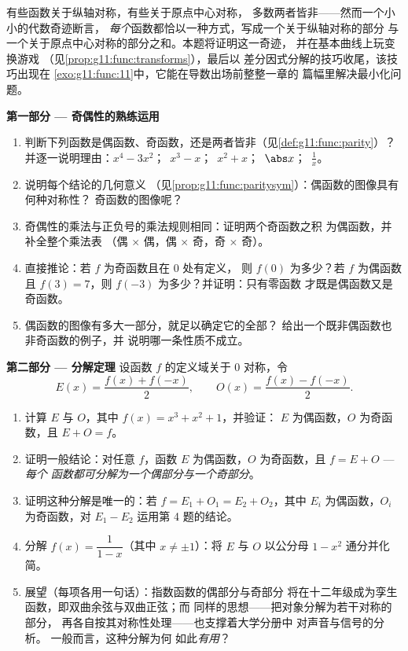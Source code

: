 \begin{problem}
\label{pb:g11:func:1}
有些函数关于纵轴对称，有些关于原点中心对称，
多数两者皆非——然而一个小小的代数奇迹断言，
\emph{每个}函数都恰以一种方式，写成一个关于纵轴对称的部分
与一个关于原点中心对称的部分之和。本题将证明这一奇迹，
并在基本曲线上玩变换游戏
（见\cref{prop:g11:func:transforms}），最后以
差分因式分解的技巧收尾，该技巧出现在
\cref{exo:g11:func:11}中，它能在导数出场前整整一章的
篇幅里解决最小化问题。

\medskip
\noindent\textbf{第一部分 --- 奇偶性的熟练运用}
\begin{enumerate}
  \item 判断下列函数是偶函数、奇函数，还是两者皆非（见\cref{def:g11:func:parity}）？
        并逐一说明理由：$x^4 - 3x^2$；\ $x^3 - x$；\ $x^2 + x$；\
        $\abs x$；\ $\frac1x$。
  \item 说明每个结论的几何意义
        （见\cref{prop:g11:func:paritysym}）：偶函数的图像具有何种对称性？
        奇函数的图像呢？
  \item 奇偶性的乘法与正负号的乘法规则相同：证明两个奇函数之积
        为偶函数，并补全整个乘法表
        （偶 $\times$ 偶，偶 $\times$
        奇，奇 $\times$ 奇）。
  \item 直接推论：若 $f$ 为奇函数且在 $0$ 处有定义，
        则 $f(0)$ 为多少？若 $f$ 为偶函数且 $f(3) = 7$，则
        $f(-3)$ 为多少？并证明：只有零函数
        才既是偶函数又是奇函数。
  \item 偶函数的图像有多大一部分，就足以确定它的全部？
        给出一个既非偶函数也非奇函数的例子，并
        说明哪一条性质不成立。
\end{enumerate}

\medskip
\noindent\textbf{第二部分 --- 分解定理}
设函数 $f$ 的定义域关于 $0$ 对称，令
\[
E(x) = \frac{f(x) + f(-x)}{2},
\qquad
O(x) = \frac{f(x) - f(-x)}{2} .
\]
\begin{enumerate}[resume]
  \item 计算 $E$ 与 $O$，其中 $f(x) = x^3 + x^2 + 1$，并验证：
        $E$ 为偶函数，$O$ 为奇函数，且 $E + O = f$。
  \item 证明一般结论：对任意 $f$，函数
        $E$ 为偶函数，$O$ 为奇函数，且 $f = E + O$ --- \emph{每个
        函数都可分解为一个偶部分与一个奇部分}。
  \item 证明这种分解是唯一的：若
        $f = E_1 + O_1 = E_2 + O_2$，其中 $E_i$ 为偶函数，$O_i$
        为奇函数，对 $E_1 - E_2$ 运用第 4 题的结论。
  \item 分解 $f(x) = \dfrac{1}{1 - x}$（其中
        $x \neq \pm 1$）：将 $E$ 与 $O$ 以公分母
        $1 - x^2$ 通分并化简。
  \item 展望（每项各用一句话）：指数函数的偶部分与奇部分
        将在十二年级成为孪生函数，即双曲余弦与双曲正弦；而
        同样的思想——把对象分解为若干对称的部分，
        再各自按其对称性处理——也支撑着大学分册中
        对声音与信号的分析。
        一般而言，这种分解为何
        如此\emph{有用}？
\end{enumerate}


\end{problem}
